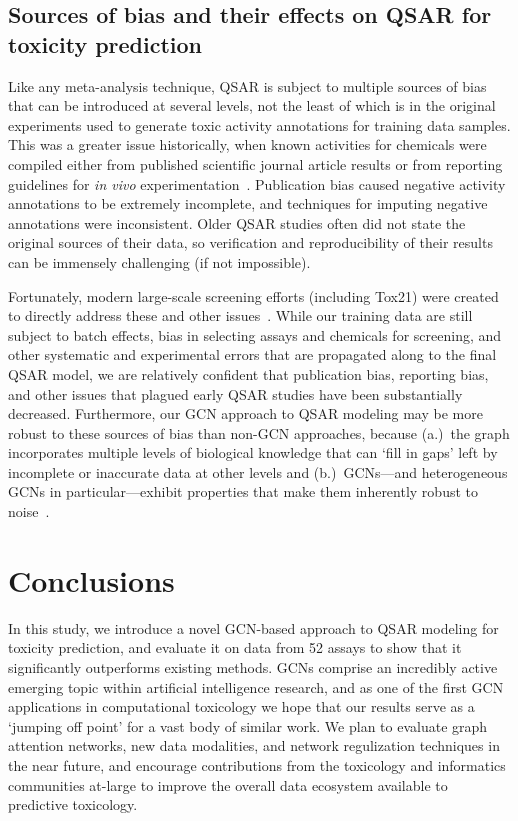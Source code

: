 \documentclass{ws-procs11x85}
\begin{document}
\subsection{Sources of bias and their effects on QSAR for toxicity prediction}
Like any meta-analysis technique, QSAR is subject to multiple sources of bias that can be introduced at several levels, not the least of which is in the original experiments used to generate toxic activity annotations for training data samples.
This was a greater issue historically, when known activities for chemicals were compiled either from published scientific journal article results or from reporting guidelines for \textit{in vivo} experimentation~\cite{cronin2019identification}.
Publication bias caused negative activity annotations to be extremely incomplete, and techniques for imputing negative annotations were inconsistent.
Older QSAR studies often did not state the original sources of their data, so verification and reproducibility of their results can be immensely challenging (if not impossible).

Fortunately, modern large-scale screening efforts (including Tox21) were created to directly address these and other issues~\cite{shoichet2004virtual}.
While our training data are still subject to batch effects, bias in selecting assays and chemicals for screening, and other systematic and experimental errors that are propagated along to the final QSAR model, we are relatively confident that publication bias, reporting bias, and other issues that plagued early QSAR studies have been substantially decreased. Furthermore, our GCN approach to QSAR modeling may be more robust to these sources of bias than non-GCN approaches, because (a.)~the graph incorporates multiple levels of biological knowledge that can `fill in gaps' left by incomplete or inaccurate data at other levels and (b.)~GCNs---and heterogeneous GCNs in particular---exhibit properties that make them inherently robust to noise~\cite{xie2020heterogeneous,nt2019revisiting}.
\section{Conclusions}
In this study, we introduce a novel GCN-based approach to QSAR modeling for toxicity prediction, and evaluate it on data from 52 assays to show that it significantly outperforms existing methods.
GCNs comprise an incredibly active emerging topic within artificial intelligence research, and as one of the first GCN applications in computational toxicology we hope that our results serve as a `jumping off point' for a vast body of similar work.
We plan to evaluate graph attention networks, new data modalities, and network regulization techniques in the near future, and encourage contributions from the toxicology and informatics communities at-large to improve the overall data ecosystem available to predictive toxicology.
\end{document}

